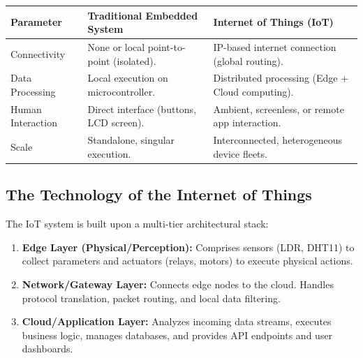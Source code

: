 \documentclass[12pt,a4paper]{article}
\renewcommand{\arraystretch}{1.45}
\begin{document}
\par\vspace{6pt}\noindent
{\renewcommand{\arraystretch}{1.35}%
\begin{tabularx}{\linewidth}{|B{3.2cm}|Y|Y|}
\hline
\textbf{Parameter} & \textbf{Traditional Embedded System} & \textbf{Internet of Things (IoT)} \\
\hline
Connectivity & None or local point-to-point (isolated). & IP-based internet connection (global routing). \\
\hline
Data Processing & Local execution on microcontroller. & Distributed processing (Edge + Cloud computing). \\
\hline
Human Interaction & Direct interface (buttons, LCD screen). & Ambient, screenless, or remote app interaction. \\
\hline
Scale & Standalone, singular execution. & Interconnected, heterogeneous device fleets. \\
\hline
\end{tabularx}}

\subsection{The Technology of the Internet of Things}
The IoT system is built upon a multi-tier architectural stack:
\begin{enumerate}[leftmargin=*, itemsep=3pt]
  \item \textbf{Edge Layer (Physical/Perception):} Comprises sensors (LDR, DHT11) to collect parameters and actuators (relays, motors) to execute physical actions.
  \item \textbf{Network/Gateway Layer:} Connects edge nodes to the cloud. Handles protocol translation, packet routing, and local data filtering.
  \item \textbf{Cloud/Application Layer:} Analyzes incoming data streams, executes business logic, manages databases, and provides API endpoints and user dashboards.
\end{enumerate}
\end{document}
